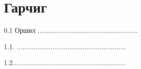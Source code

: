 \documentclass[12pt]{article}
\begin{document}
	
	
	
\section     {Гарчиг}
               0.1 Оршил .....................................................
               
               1.1. ..........................................................
               
               1.2............................................................
               
               
               
               
               
               
               
               
               
               
               
               
               
               
               
               
               
               
\end{document}
